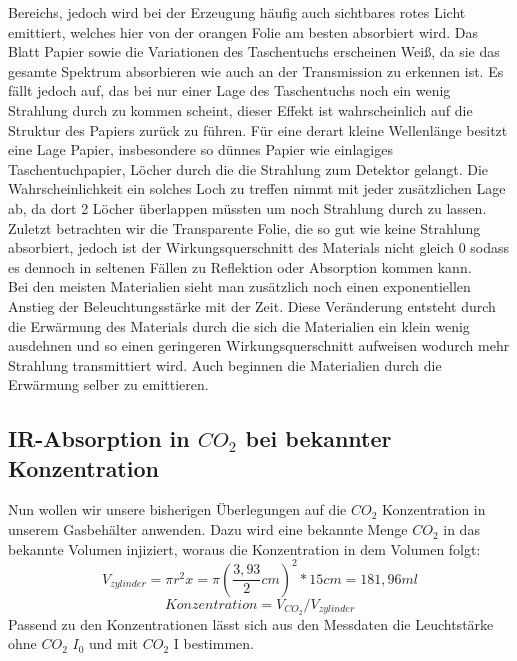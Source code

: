 \documentclass{article}
\begin{document}
            Bereichs, jedoch wird bei der Erzeugung häufig auch sichtbares rotes Licht emittiert, welches
            hier von der orangen Folie am besten absorbiert wird. Das Blatt Papier sowie die Variationen
            des Taschentuchs erscheinen Weiß, da sie das gesamte Spektrum absorbieren wie auch an der
            Transmission zu erkennen ist. Es fällt jedoch auf, das bei nur einer Lage des Taschentuchs
            noch ein wenig Strahlung durch zu kommen scheint, dieser Effekt ist wahrscheinlich auf die
            Struktur des Papiers zurück zu führen. Für eine derart kleine Wellenlänge besitzt eine Lage Papier, insbesondere
            so dünnes Papier wie einlagiges Taschentuchpapier, Löcher durch die die Strahlung zum Detektor gelangt.
            Die Wahrscheinlichkeit ein solches Loch zu treffen
            nimmt mit jeder zusätzlichen Lage ab, da dort 2 Löcher überlappen müssten um noch
            Strahlung durch zu lassen. Zuletzt betrachten wir die Transparente Folie, die so gut wie keine Strahlung absorbiert,
            jedoch ist der Wirkungsquerschnitt des Materials nicht gleich 0 sodass es dennoch in seltenen 
            Fällen zu Reflektion oder Absorption kommen kann.\\
            Bei den meisten Materialien sieht man zusätzlich noch einen exponentiellen Anstieg der Beleuchtungsstärke mit 
            der Zeit. Diese Veränderung entsteht durch die Erwärmung des Materials durch die sich die Materialien ein klein wenig
            ausdehnen und so einen geringeren Wirkungsquerschnitt aufweisen wodurch mehr Strahlung transmittiert wird. Auch beginnen die Materialien durch die Erwärmung selber zu emittieren.
             
        \subsection{IR-Absorption in $CO_2$ bei bekannter Konzentration}
            Nun wollen wir unsere bisherigen Überlegungen auf die $CO_2$ Konzentration in unserem Gasbehälter
            anwenden. Dazu wird eine bekannte Menge $CO_2$ in das bekannte Volumen injiziert, woraus
            die Konzentration in dem Volumen folgt:
            \begin{equation}
                V_{zylinder} = \pi r^2 x = \pi (\frac{3,93}{2} cm)^2 *15cm = 181,96ml
            \end{equation}
            \begin{equation}
                Konzentration = V_{CO_2}/V_{zylinder}
            \end{equation}
            Passend zu den Konzentrationen lässt sich aus den Messdaten die Leuchtstärke
            ohne $CO_2$ $I_0$ und mit $CO_2$ I bestimmen.
            
\end{document}
